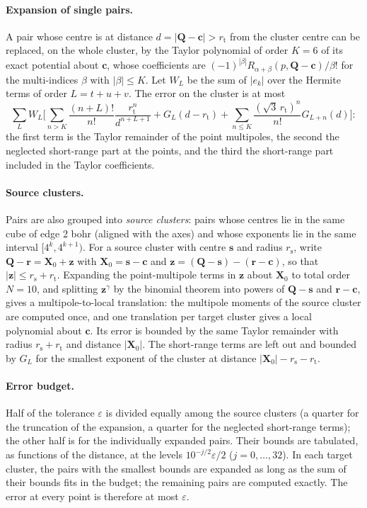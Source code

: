 \documentclass[11pt,a4paper]{article}
\begin{document}
\paragraph{Expansion of single pairs.} A pair whose centre is at distance
$d=|\mathbf Q-\mathbf c|>r_{\mathrm t}$ from the cluster centre can be
replaced, on the whole cluster, by the Taylor polynomial of order $K=6$ of
its exact potential about $\mathbf c$, whose coefficients are
$(-1)^{|\beta|}R_{\alpha+\beta}(p,\mathbf Q-\mathbf c)/\beta!$ for the
multi-indices $\beta$ with $|\beta|\le K$. Let $W_L$ be the sum of $|e_k|$
over the Hermite terms of order $L=t+u+v$. The error on the cluster is at
most
\begin{equation}
 \sum_LW_L\Big[\sum_{n>K}\frac{(n+L)!}{n!}\frac{r_{\mathrm t}^n}{d^{n+L+1}}
 +G_L(d-r_{\mathrm t})+\sum_{n\le K}\frac{(\sqrt3\,r_{\mathrm t})^n}{n!}G_{L+n}(d)\Big]:
\end{equation}
the first term is the Taylor remainder of the point multipoles, the second
the neglected short-range part at the points, and the third the
short-range part included in the Taylor coefficients.

\paragraph{Source clusters.} Pairs are also grouped into \emph{source
clusters}: pairs whose centres lie in the same cube of edge 2 bohr (aligned
with the axes) and whose exponents lie in the same interval
$[4^k,4^{k+1})$. For a source cluster with centre $\mathbf s$ and radius
$r_{\mathrm s}$, write
$\mathbf Q-\mathbf r=\mathbf X_0+\mathbf z$ with $\mathbf X_0=\mathbf s-\mathbf c$
and $\mathbf z=(\mathbf Q-\mathbf s)-(\mathbf r-\mathbf c)$, so that
$|\mathbf z|\le r_{\mathrm s}+r_{\mathrm t}$. Expanding the point-multipole
terms in $\mathbf z$ about $\mathbf X_0$ to total order $N=10$, and
splitting $\mathbf z^\gamma$ by the binomial theorem into powers of
$\mathbf Q-\mathbf s$ and $\mathbf r-\mathbf c$, gives a
multipole-to-local translation: the multipole moments of the source cluster
are computed once, and one translation per target cluster gives a local
polynomial about $\mathbf c$. Its error is bounded by the same Taylor
remainder with radius $r_{\mathrm s}+r_{\mathrm t}$ and distance
$|\mathbf X_0|$. The short-range terms are left out and bounded by $G_L$
for the smallest exponent of the cluster at distance
$|\mathbf X_0|-r_{\mathrm s}-r_{\mathrm t}$.

\paragraph{Error budget.} Half of the tolerance $\varepsilon$ is divided
equally among the source clusters (a quarter for the truncation of the
expansion, a quarter for the neglected short-range terms); the other half
is for the individually expanded pairs. Their bounds are tabulated, as
functions of the distance, at the levels $10^{-j/2}\varepsilon/2$
($j=0,\dots,32$). In each target cluster, the pairs with the smallest
bounds are expanded as long as the sum of their bounds fits in the budget;
the remaining pairs are computed exactly. The error at every point is
therefore at most $\varepsilon$.
\end{document}

